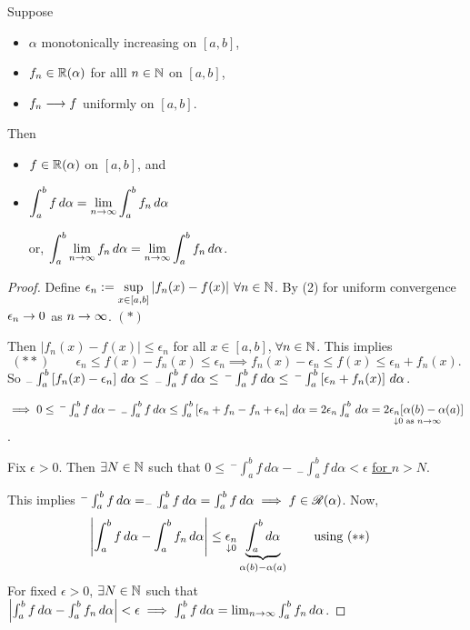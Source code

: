 \documentclass[]{article}
\begin{document}
\begin{theorem}
	\label{thm-7-16}
	Suppose
	\begin{itemize}
		\item $\alpha$ monotonically increasing on $[a,b]$,
		\item $f_n\in\mb R(\alpha)$ for alll $n\in\mb N$ on $[a,b]$,
		\item $f_n\lra f$ uniformly on $[a,b]$.
	\end{itemize}
	Then
	\begin{itemize}
		\item $f\in\mb R(\alpha)$ on $[a,b]$, and
		\item $\ds\int_a^b f\,d\alpha = \lim_{n\ra\infty} \int_a^b f_n\,d\alpha$
		\item[or,] $\ds\int_a^b\lim_{n\ra\infty} f_n\,d\alpha = \lim_{n\ra\infty} \int_a^b f_n\,d\alpha$.
	\end{itemize}
\end{theorem}
\begin{proof}
	Define $\ds\epsilon_n:= \sup_{x\in[a,b]} |f_n(x)-f(x)|$ $\forall n\in\mb N$.
	By (2) for uniform convergence $\epsilon_n\ra0$ as $n\ra\infty$. $(*)$

	Then $|f_n(x)-f(x)| \leq \epsilon_n$ for all $x\in[a,b]$, $\forall n\in\mb N$.
	This implies $$(**) \qquad \epsilon_n\leq f(x) - f_n(x) \leq \epsilon_n \implies f_n(x)-\epsilon_n \leq f(x) \leq \epsilon_n + f_n(x).$$
	So $_-\int_a^b\blr{f_n(x)-\epsilon_n}\,d\alpha \leq\, _-\int_a^bf\,d\alpha \leq\, ^-\int_a^bf\,d\alpha \leq\, ^-\int_a^b \blr{\epsilon_n+f_n(x)}\,d\alpha$.

	$\implies 0\leq\, ^-\int_a^bf\,d\alpha -\, _-\int_a^bf\,d\alpha \leq \int_a^b \blr{\epsilon_n+f_n - f_n +\epsilon_n}\,d\alpha = 2\epsilon_n\int_a^b\,d\alpha = 2\us{\downarrow0\text{ as }n\ra\infty}{\epsilon_n[\alpha(b)-\alpha}(a)]$.

	Fix $\epsilon>0$. Then $\exists N\in\mb N$ such that $0\leq\, ^-\int_a^bf\,d\alpha -\,_-\int_a^bf\,d\alpha < \epsilon$ \ul{\ul{for $n>N$}}.
	
	This implies $^-\int_a^bf\,d\alpha = _-\int_a^bf\,d\alpha = \int_a^bf\,d\alpha \implies f\in\ms R(\alpha)$. Now,
	\begin{align*}
		\mlr{\int_a^bf\,d\alpha - \int_a^bf_n\,d\alpha}
		&\leq \us{\downarrow0}{\epsilon_n} \ub{\alpha(b)-\alpha(a)}{\int_a^b d\alpha} \qquad \text{using }(**)
	\end{align*}
	For fixed $\epsilon>0$, $\exists N\in\mb N$ such that $\mlr{\int_a^bf\,d\alpha - \int_a^bf_n\,d\alpha} < \epsilon \implies \int_a^bf\,d\alpha = \lim_{n\ra\infty} \int_a^b f_n\,d\alpha$.
\end{proof}
\end{document}
